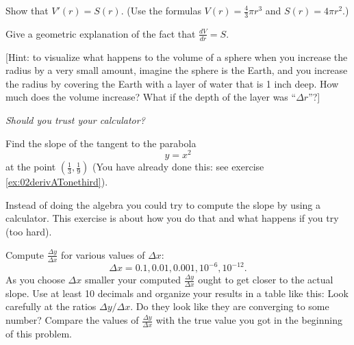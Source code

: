 \begin{multicols}{2}
\subprob Show that $V'(r) = S(r)$.  (Use the
formulas $V(r) = \frac43\pi r^3$ and $S(r) = 4\pi r^2$.)




\subprob Give a geometric explanation of the fact that
$\frac{dV} {dr} = S$.




[Hint: to visualize what happens to the volume of a sphere when
you increase the radius by a very small amount, imagine  the sphere is
the Earth, and you increase the radius by covering the Earth with
a layer of water that is 1 inch deep.  How much does the volume
increase?  What if the depth of the layer was ``$\Delta r$''?]




\problem \label{ex:bad-calculator-bad} \groupproblem 
\itshape Should you trust your calculator?\upshape




Find the slope of the tangent to the parabola
\[
y=x^2
\]
at the point
$(\frac13, \frac{1}{9})$ (You have already done this: see exercise
\ref{ex:02derivATonethird}).




Instead of doing the algebra you could try to compute the slope by
using a calculator.  This exercise is about how you do that and what
happens if you try (too hard).




Compute $\frac{\Delta y}{\Delta x}$ for various values of $\Delta x$:
\[
\Delta x = 0.1, 0.01, 0.001, 10^{-6}, 10^{-12}.
\]
As you choose $\Delta x$ smaller your computed $\frac{\Delta
  y}{\Delta x}$ ought to get closer to the actual slope.  Use at
least 10 decimals and organize your results in a table like this:
Look carefully at the ratios $\Delta y/\Delta x$.  Do they look like
they are converging to some number?  Compare the values of
$\frac{\Delta y}{\Delta x}$ with the true value you got in the
beginning of this problem.












\end{multicols}
\noproblemfont




